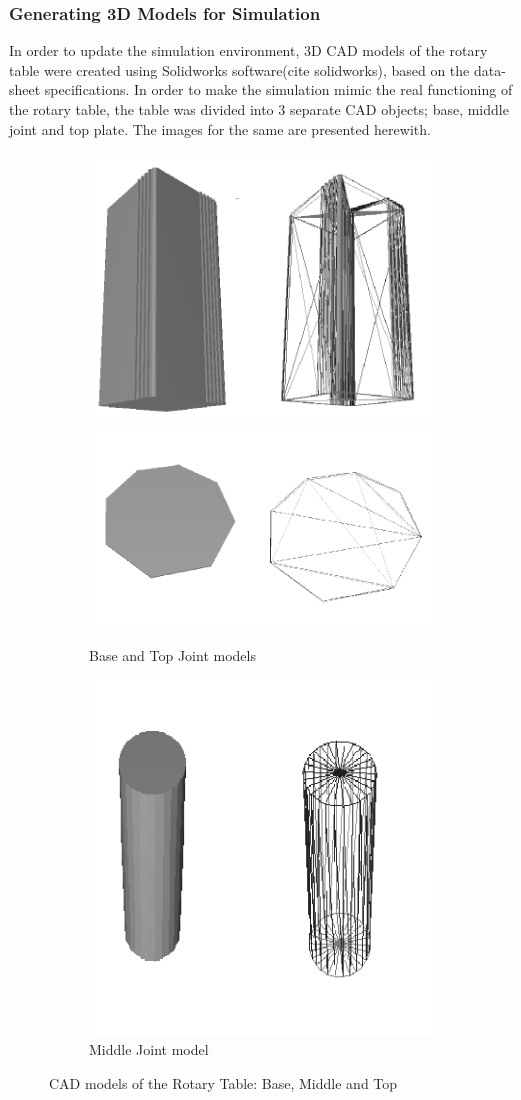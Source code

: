 \subsubsection{Generating 3D Models for Simulation}
In order to update the simulation environment, 3D CAD models of the rotary table were created using Solidworks software(cite solidworks), based on the data-sheet specifications. In order to make the simulation mimic the real functioning of the rotary table, the table was divided into 3 separate CAD objects; base, middle joint and top plate. The images for the same are presented herewith. 

\begin{figure}[!htbp] %
\begin{subfigure}{\linewidth}
   \includegraphics[width=.5\linewidth]{images/Base.png}
   \includegraphics[width=.5\linewidth]{images/Top.png}
      \caption[dd]{Base and Top Joint models}
   \end{subfigure}\par\medskip
   \begin{subfigure}{\linewidth}
   \centering
   \includegraphics[width=.5\linewidth]{images/Mid.png}
   \caption[dd]{Middle Joint model}
   \end{subfigure}
\caption[dd]{CAD models of the Rotary Table: Base, Middle and Top}
\label{fig:img11}
\end{figure}
 

